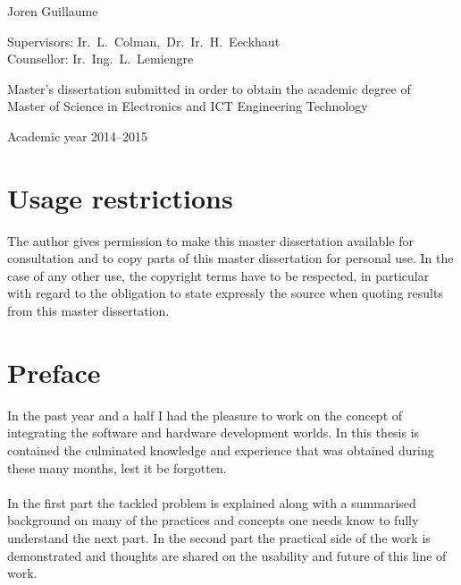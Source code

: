 \documentclass[11pt,british]{article}
\begin{document}
\begin{titlepage}
\begin{center}
\vspace{1.2cm}

Joren Guillaume

\fontsize{12pt}{14pt}
\selectfont

\vspace{3.5cm}

Supervisors: Ir.~L.~Colman,~Dr.~Ir.~H.~Eeckhaut\\
Counsellor: Ir.~Ing.~L.~Lemiengre\\

\vspace{2cm}

Master's dissertation submitted in order to obtain the academic degree of\\
Master of Science in Electronics and ICT Engineering Technology

\vspace{1cm}

Academic year 2014--2015

\end{center}
\end{titlepage}


%


\newpage{}
\part*{Usage restrictions}

The author gives permission to make this master dissertation available for consultation 
and to copy parts of this master dissertation for personal use. 
 In the case of any other use, the copyright terms have to be respected, in particular with regard to 
the obligation to state expressly the source when quoting results from this master dissertation.

\pagebreak{}


\newpage{}\part*{Preface}
In the past year and a half I had the pleasure to work on the concept of integrating the software and hardware development worlds. In this thesis is contained the culminated knowledge and experience that was obtained during these many months, lest it be forgotten.
\\
\\
In the first part the tackled problem is explained along with a summarised background on many of the practices and concepts one needs know to fully understand the next part. In the second part the practical side of the work is demonstrated and thoughts are shared on the usability and future of this line of work.
\\
\\
\end{document}
